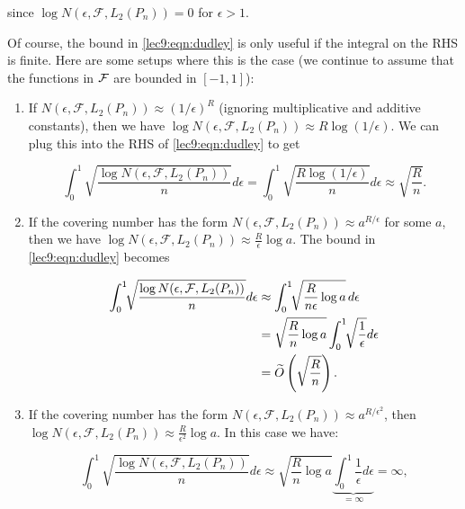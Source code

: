 since $\log N(\epsilon, \mathcal{F}, L_2(P_n))=0$ for $\epsilon >1$.


Of course, the bound in \eqref{lec9:eqn:dudley} is only useful if the integral on the RHS is finite. Here are some setups where this is the case (we continue to assume that the functions in $\mathcal F$ are bounded in $[-1, 1]$):

\begin{enumerate}
\item If $N(\epsilon, \mathcal{F}, L_2(P_n))\approx (1 / \epsilon)^R$ (ignoring multiplicative and additive constants), then we have $\log N(\epsilon, \mathcal{F}, L_2(P_n))\approx  R\log (1/\epsilon)$. We can plug this into the RHS of \eqref{lec9:eqn:dudley} to get
        
\begin{equation}
\int_{0}^{1}\sqrt{\frac{\log N(\epsilon, \mathcal{F}, L_2({P_n}))}{n}}d\epsilon = \int_{0}^1\sqrt{\frac{R\log(1/\epsilon)}{n}}d\epsilon \approx \sqrt{\frac{R}{n}}.
\end{equation}
            
\item If the covering number has the form $N(\epsilon, \mathcal{F}, L_2(P_n))\approx a^{R/\epsilon}$ for some $a$, then we have $\log N(\epsilon, \mathcal{F}, L_2(P_n)) \approx \frac{R}{\epsilon}\log a$. The bound in \eqref{lec9:eqn:dudley} becomes
        
\begin{align}
\int_0^1\!\!\sqrt{\frac{\log N(\epsilon, \mathcal{F}, L_2(P_n))}{n}}d\epsilon &\approx \int_0^1\!\!\sqrt{\frac{R}{n\epsilon}\log a}\, d\epsilon \\
&= \sqrt{\frac{R}{n}\log a} \int_0^1\!\!\sqrt{\frac{1}{\epsilon}}d\epsilon \\
&= \widetilde{O} \left(\sqrt{\frac{R}{n}}\right).
\end{align}
        
\item If the covering number has the form $N(\epsilon, \mathcal{F}, L_2(P_n))\approx a^{R/\epsilon^2}$, then $\log N(\epsilon, \mathcal{F}, L_2(P_n))\approx \frac{R}{\epsilon^2}\log a$. In this case we have:
        
\begin{equation}\int_0^1\sqrt{\frac{\log N(\epsilon, \mathcal{F}, L_2(P_n))}{n}}d\epsilon \approx \sqrt{\frac{R}{n}\log a} \underbrace{\int_0^1\frac{1}{\epsilon}d\epsilon}_{=\infty}=\infty,
\end{equation}


\end{enumerate}
